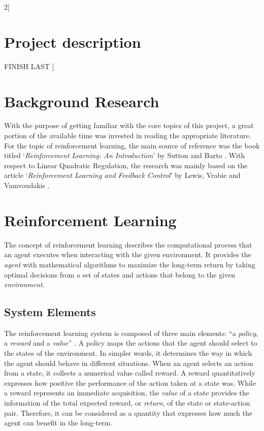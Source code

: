 \documentclass[a4paper]{article}
\begin{document}
	\begin{multicols}{2}[
		\section*{Project description}
		FINISH LAST
		]
		
		\section{Background Research}
		With the purpose of getting familiar with the core topics of this project, a great portion of the available time was invested in reading the appropriate literature. For the topic of reinforcement learning, the main source of reference was the book titled \enquote*{\textit{Reinforcement Learning: An Introduction}} by Sutton and Barto \cite{reinfbook}. With respect to Linear Quadratic Regulation, the research was mainly based on the article \enquote*{\textit{Reinforcement Learning and Feedback Control}} by Lewis, Vrabie and Vamvoudakis \cite{lqrart}.
		
		\section{Reinforcement Learning}
		The concept of reinforcement learning describes the computational process that an agent executes when interacting with the given environment. It provides the \textit{agent} with mathematical algorithms to maximize the long-term return by taking optimal decisions from a set of states and actions that belong to the given \textit{environment}.
		
		\subsection{System Elements}
		The reinforcement learning system is composed of three main elements: \enquote{a \textit{policy}, a \textit{reward} and a \textit{value}} \cite{reinfel}. A policy maps the actions that the agent should select to the states of the environment. In simpler words, it determines the way in which the agent should behave in different situations. When an agent selects an action from a state, it collects a numerical value called reward. A reward quantitatively expresses how positive the performance of the action taken at a state was. While a reward represents an immediate acquisition, the \textit{value} of a state provides the information of the total expected reward, or \textit{return}, of the state or state-action pair. Therefore, it can be considered as a quantity that expresses how much the agent can benefit in the long-term.
		

\end{multicols}
\end{document}
